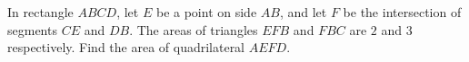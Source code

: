 In rectangle $ABCD$, let $E$ be a point on side $AB$, and let $F$ be the intersection of segments $CE$ and $DB$. The areas of triangles $EFB$ and $FBC$ are $2$ and $3$ respectively. Find the area of quadrilateral $AEFD$.
